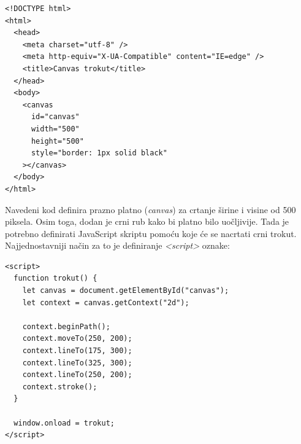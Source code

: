 \documentclass{foi}
\begin{document}
\begin{verbatim}
<!DOCTYPE html>
<html>
  <head>
    <meta charset="utf-8" />
    <meta http-equiv="X-UA-Compatible" content="IE=edge" />
    <title>Canvas trokut</title>
  </head>
  <body>
    <canvas
      id="canvas"
      width="500"
      height="500"
      style="border: 1px solid black"
    ></canvas>
  </body>
</html>

\end{verbatim}
Navedeni kod definira prazno platno (\textit{canvas}) za crtanje širine i visine od 500 piksela. Osim toga, dodan je crni rub kako bi platno bilo uočljivije. Tada je potrebno definirati JavaScript skriptu pomoću koje će se nacrtati crni trokut. Najjednostavniji način za to je definiranje \textit{<script>} oznake:

\begin{verbatim}
<script>
  function trokut() {
    let canvas = document.getElementById("canvas");
    let context = canvas.getContext("2d");

    context.beginPath();
    context.moveTo(250, 200);
    context.lineTo(175, 300);
    context.lineTo(325, 300);
    context.lineTo(250, 200);
    context.stroke();
  }

  window.onload = trokut;
</script>

\end{verbatim}
\end{document}
